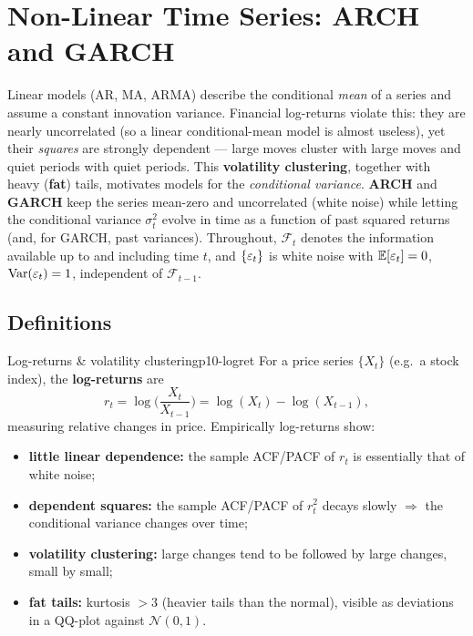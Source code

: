 \section{Non-Linear Time Series: ARCH and GARCH}
\label{sec:archgarch}

Linear models (AR, MA, ARMA) describe the conditional \emph{mean} of a series and
assume a constant innovation variance. Financial log-returns violate this: they
are nearly uncorrelated (so a linear conditional-mean model is almost useless),
yet their \emph{squares} are strongly dependent --- large moves cluster with
large moves and quiet periods with quiet periods. This \textbf{volatility
clustering}, together with heavy (\textbf{fat}) tails, motivates models for the
\emph{conditional variance}. \textbf{ARCH} and \textbf{GARCH} keep the series
mean-zero and uncorrelated (white noise) while letting the conditional variance
$\sigma_t^2$ evolve in time as a function of past squared returns (and, for
GARCH, past variances). Throughout, $\mathcal{F}_t$ denotes the information
available up to and including time $t$, and $\{\varepsilon_t\}$ is white noise with
$\mathbb{E}[\varepsilon_t]=0$, $\operatorname{Var}(\varepsilon_t)=1$, independent of $\mathcal{F}_{t-1}$.

\subsection{Definitions}

\begin{definition}{Log-returns \& volatility clustering}{p10-logret}
For a price series $\{X_t\}$ (e.g.\ a stock index), the \textbf{log-returns} are
\[
r_t=\log\!\Big(\frac{X_t}{X_{t-1}}\Big)=\log(X_t)-\log(X_{t-1}),
\]
measuring relative changes in price. Empirically log-returns show:
\begin{itemize}
  \item \textbf{little linear dependence:} the sample ACF/PACF of $r_t$ is
        essentially that of white noise;
  \item \textbf{dependent squares:} the sample ACF/PACF of $r_t^2$ decays slowly
        $\Rightarrow$ the conditional variance changes over time;
  \item \textbf{volatility clustering:} large changes tend to be followed by
        large changes, small by small;
  \item \textbf{fat tails:} kurtosis $>3$ (heavier tails than the normal),
        visible as deviations in a QQ-plot against $\mathcal{N}(0,1)$.
\end{itemize}
\end{definition}

